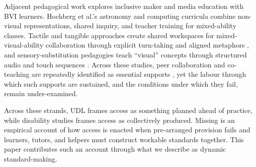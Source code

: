 Adjacent pedagogical work explores inclusive maker and media education with BVI learners. Hochberg et al.'s \cite{hochberg_supporting_2024} astronomy and computing curricula combine non-visual representations, shared inquiry, and teacher training for mixed-ability classes. Tactile and tangible approaches create shared workspaces for mixed-visual-ability collaboration through explicit turn-taking and aligned metaphors \cite{khalaila_streetscape_2025,rocha_awareness_2025}, and sensory-substitution pedagogies teach ``visual'' concepts through structured audio and touch sequences \cite{he_charting_2024}. Across these studies, peer collaboration and co-teaching are repeatedly identified as essential supports \cite{maesala_overcoming_2024,strogilos_meta-synthesis_2023,travers_collaboration_2024,miyauchi_systematic_2020}, yet the labour through which such supports are sustained, and the conditions under which they fail, remain under-examined.

Across these strands, UDL frames access as something planned ahead of practice, while disability studies frames access as collectively produced. Missing is an empirical account of how access is enacted when pre-arranged provision fails and learners, tutors, and helpers must construct workable standards together. This paper contributes such an account through what we describe as dynamic standard-making.
